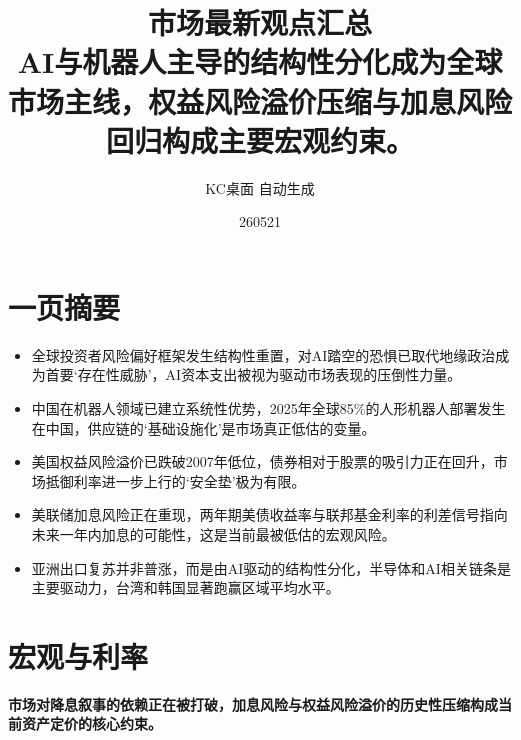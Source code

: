 \documentclass[11pt]{ctexart}
\title{\textbf{市场最新观点汇总}\\[0.4em]{\large AI与机器人主导的结构性分化成为全球市场主线，权益风险溢价压缩与加息风险回归构成主要宏观约束。}}
\author{KC桌面 自动生成}
\date{260521}
\begin{document}
\maketitle
\section*{一页摘要}
\begin{itemize}
  \item 全球投资者风险偏好框架发生结构性重置，对AI踏空的恐惧已取代地缘政治成为首要‘存在性威胁’，AI资本支出被视为驱动市场表现的压倒性力量。
  \item 中国在机器人领域已建立系统性优势，2025年全球85\%的人形机器人部署发生在中国，供应链的‘基础设施化’是市场真正低估的变量。
  \item 美国权益风险溢价已跌破2007年低位，债券相对于股票的吸引力正在回升，市场抵御利率进一步上行的‘安全垫’极为有限。
  \item 美联储加息风险正在重现，两年期美债收益率与联邦基金利率的利差信号指向未来一年内加息的可能性，这是当前最被低估的宏观风险。
  \item 亚洲出口复苏并非普涨，而是由AI驱动的结构性分化，半导体和AI相关链条是主要驱动力，台湾和韩国显著跑赢区域平均水平。
\end{itemize}
\section{宏观与利率}
\textbf{市场对降息叙事的依赖正在被打破，加息风险与权益风险溢价的历史性压缩构成当前资产定价的核心约束。}
\end{document}
